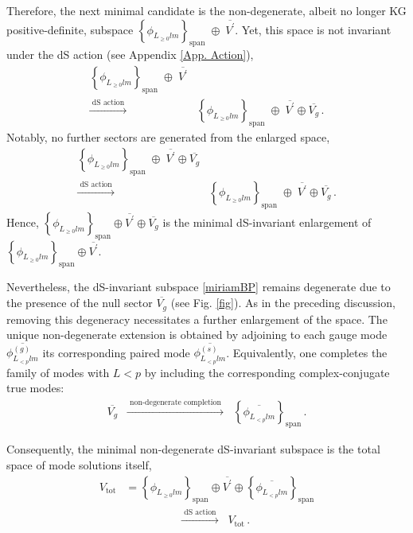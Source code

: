 \documentclass[aps,twocolumn,nofootinbib]{revtex4}
\begin{document}
Therefore, the next minimal candidate is the non-degenerate, albeit no longer KG positive-definite, subspace $\left\{\phi^{}_{L^{}_{\geqslant 0}lm}\right\}_{\mathrm{span}} \; \oplus \; \overline{V^\prime}$. Yet, this space is not invariant under the dS action (see Appendix \ref{App. Action}),
\begin{align}
    \left\{\phi^{}_{L^{}_{\geqslant 0}lm}\right\}_{\mathrm{span}} \; \oplus \; \overline{V^\prime} & \nonumber\\[3pt]
    \xrightarrow[]{\text{ dS action }}\;\; & \left\{\phi^{}_{L^{}_{\geqslant 0}lm}\right\}_{\mathrm{span}} \; \oplus \; \overline{V^\prime} \oplus \overline{V_g} \,.
\end{align}
Notably, no further sectors are generated from the enlarged space,
\begin{align}\label{miriamBP}
    \left\{\phi^{}_{L^{}_{\geqslant 0}lm}\right\}_{\mathrm{span}} \; \oplus \; \overline{V^\prime} \oplus \overline{V_g} & \nonumber\\[3pt]
    \xrightarrow[]{\text{ dS action }}\;\; & \left\{\phi^{}_{L^{}_{\geqslant 0}lm}\right\}_{\mathrm{span}} \; \oplus \; \overline{V^\prime} \oplus \overline{V_g} \,.
\end{align}
Hence, $\left\{\phi^{}_{L_{\geqslant 0}lm}\right\}_{\mathrm{span}} \oplus \overline{V^\prime} \oplus \overline{V_g}$ is the minimal dS-invariant enlargement of $\left\{\phi^{}_{L_{\geqslant 0}lm}\right\}_{\mathrm{span}} \oplus \overline{V^\prime}$.

Nevertheless, the dS-invariant subspace \eqref{miriamBP} remains degenerate due to the presence of the null sector $\overline{V_g}$ (see Fig. \ref{fig}). As in the preceding discussion, removing this degeneracy necessitates a further enlargement of the space. The unique non-degenerate extension is obtained by adjoining to each gauge mode $\overline{\phi^{(g)}_{L^{}_{<p}lm}}$ its corresponding paired mode $\overline{\phi^{(s)}_{L^{}_{<p}lm}}$. Equivalently, one completes the family of modes with $L<p$ by including the corresponding complex-conjugate true modes:
\begin{align}
    \overline{V_g}
    \;\;\xrightarrow[]{\text{ non-degenerate completion }}\;\; \left\{\overline{\phi^{}_{L^{}_{<p}lm}}\right\}_{\mathrm{span}} \,.
\end{align}

Consequently, the minimal non-degenerate dS-invariant subspace is the total space of mode solutions itself,
\begin{align}
    V_{\text{tot}} &= \left\{\phi^{}_{L_{\geqslant 0}lm}\right\}_{\mathrm{span}} \oplus \overline{V^\prime} \oplus \left\{\overline{\phi^{}_{L^{}_{<p}lm}}\right\}_{\mathrm{span}} \nonumber\\[4pt]
    &\hspace{2cm}\xrightarrow[]{\text{ dS action }}\;\; V_{\text{tot}} \,.
\end{align}
\end{document}

